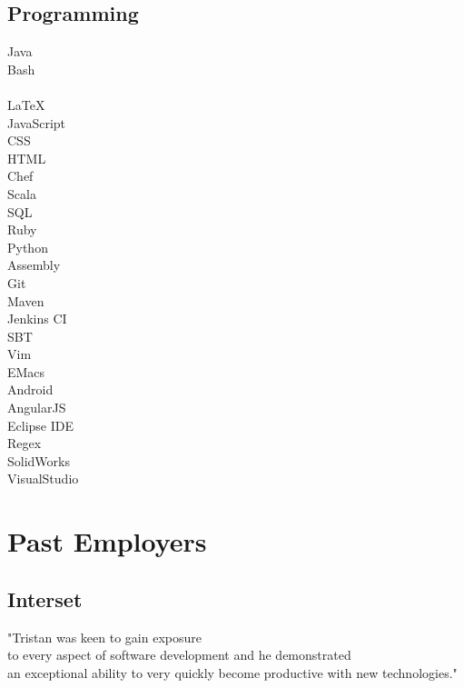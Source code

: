 \documentclass[letterpaper]{deedy-resume-modified} %
\begin{document}
\begin{minipage}[t]{0.33\textwidth}
\subsection{Programming}
Java \tab {\bf + + + + +}\\
Bash \tab {\bf + + + + +}\\
\CPP \tab {\bf + + + +}\\
\LaTeX \tab {\bf + + +}\\
JavaScript \tab {\bf + + +}\\
CSS \tab {\bf + + +}\\
HTML \tab {\bf + + +}\\
Chef \tab {\bf + + +}\\
Scala \tab {\bf + + +}\\
SQL \tab {\bf + + +}\\
Ruby \tab {\bf + +}\\
Python \tab {\bf + +}\\
Assembly \tab {\bf +}\\

\sectionspace
{}
Git \tab {\bf + + + + +}\\
Maven \tab {\bf + + + + +}\\
Jenkins CI \tab {\bf + + + +}\\
SBT \tab {\bf + + + +}\\
Vim \tab {\bf + + + +}\\
EMacs \tab {\bf + + +}\\
Android \tab {\bf + + +}\\
AngularJS \tab {\bf + + +}\\
Eclipse IDE \tab {\bf + + +}\\
Regex \tab {\bf + +}\\
SolidWorks \tab {\bf + +}\\
VisualStudio \tab {\bf + +}\\

\sectionspace


\section{Past Employers}
\subsection{Interset}
"Tristan was keen to gain exposure\\to every aspect of software development and he demonstrated\\an exceptional ability to very quickly become productive with new technologies." \\

\end{minipage} %
\end{document}
